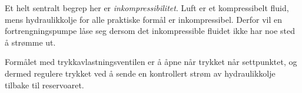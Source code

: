 
Et helt sentralt begrep her er {\it inkompressibilitet}. Luft er et kompressibelt fluid, mens hydraulikkolje for alle praktiske formål er inkompressibel. Derfor vil en fortrengningspumpe låse seg dersom det inkompressible fluidet ikke har noe sted å strømme ut.







Formålet med trykkavlastningsventilen er å åpne når trykket når settpunktet, og dermed regulere trykket ved å sende en kontrollert strøm av hydraulikkolje tilbake til reservoaret.




